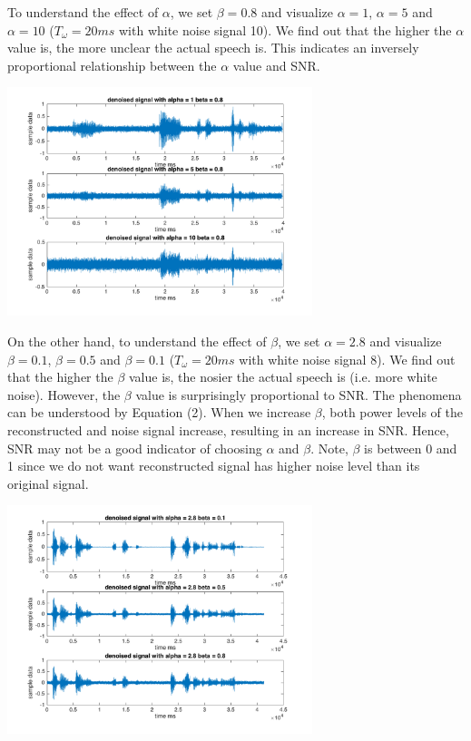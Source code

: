 \documentclass[journal]{IEEEtran}
\begin{document}
\begin{flushleft}
To understand the effect of $\alpha$, we set $\beta = 0.8$ and visualize $\alpha = 1$, $\alpha = 5$ and $\alpha = 10$ ($T_\omega = 20ms$ with white noise signal 10). We find out that the higher the $\alpha$ value is, the more unclear the actual speech is. This indicates an inversely proportional relationship between the $\alpha$ value and SNR. 
\end{flushleft}
\centering 
\includegraphics[width=3.5in]{alpha1}

\begin{flushleft}
On the other hand, to understand the effect of $\beta$, we set $\alpha = 2.8$ and visualize $\beta = 0.1$, $\beta = 0.5$ and $\beta = 0.1$ ($T_\omega = 20ms$ with white noise signal 8). We find out that the higher the $\beta$ value is, the nosier the actual speech is (i.e. more white noise). However, the $\beta$ value is surprisingly proportional to SNR. The phenomena can be understood by Equation (2). When we increase $\beta$, both power levels of the reconstructed and noise signal increase, resulting in an increase in SNR. Hence, SNR may not be a good indicator of choosing $\alpha$ and $\beta$. Note, $\beta$ is between 0 and 1 since we do not want reconstructed signal has higher noise level than its original signal.  
\end{flushleft}
\centering 
\includegraphics[width=3.5in]{alpha2}
\end{document}
